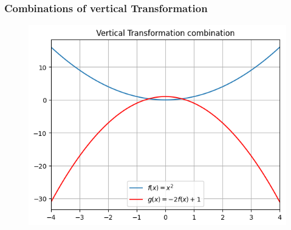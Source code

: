 \documentclass{beamer}
\begin{document}
\begin{frame}
  \frametitle{Combinations of vertical Transformation}
  \begin{figure}[h]    
    \centering
    \includegraphics[scale=0.55]{vertical_combination.png}
    \end{figure}
\end{frame}
\end{document}
